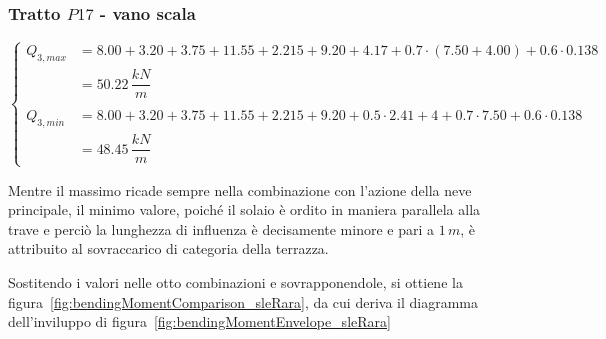 \subsubsection*{Tratto $P17$ - vano scala}
\begin{equation*}
	\begin{cases}
		Q_{3,max} &= 8.00+3.20+3.75 + 11.55+2.215+9.20 + 4.17 + 0.7\cdot(7.50+4.00) + 0.6\cdot0.138\\
		&= 50.22\,\dfrac{kN}{m}\\\\
		Q_{3,min} &= 8.00+3.20+3.75 + 11.55+2.215+9.20 + 0.5\cdot2.41 + 4+ 0.7\cdot7.50 + 0.6\cdot0.138\\
		&= 48.45\,\dfrac{kN}{m}
	\end{cases}
\end{equation*}

Mentre il massimo ricade sempre nella combinazione con l'azione della neve principale, il minimo valore, poiché il solaio è ordito in maniera parallela alla trave e perciò la lunghezza di influenza è decisamente minore e pari a $1\,m$, è attribuito al sovraccarico di categoria della terrazza.

Sostitendo i valori nelle otto combinazioni e sovrapponendole, si ottiene la figura~\ref{fig:bendingMomentComparison_sleRara}, da cui deriva il diagramma dell'inviluppo di figura~\ref{fig:bendingMomentEnvelope_sleRara}

